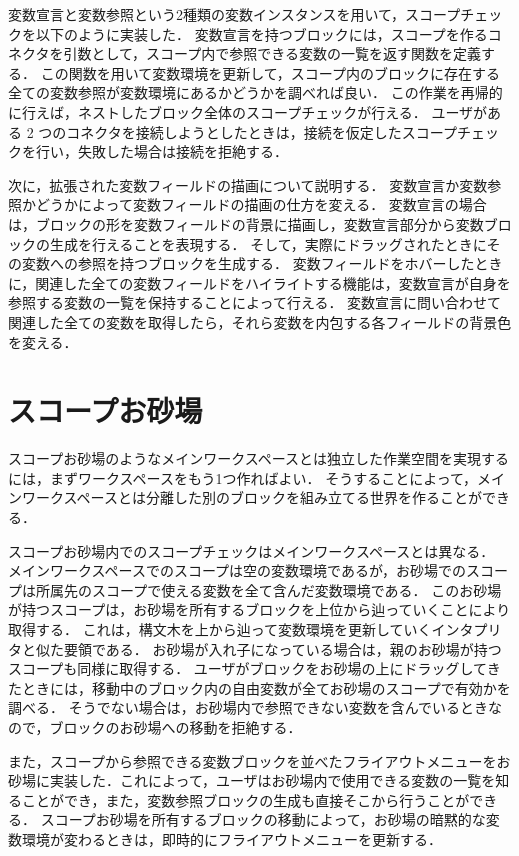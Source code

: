 変数宣言と変数参照という2種類の変数インスタンスを用いて，スコープチェックを以下のように実装した．
変数宣言を持つブロックには，スコープを作るコネクタを引数として，スコープ内で参照できる変数の一覧を返す関数を定義する．
この関数を用いて変数環境を更新して，スコープ内のブロックに存在する全ての変数参照が変数環境にあるかどうかを調べれば良い．
この作業を再帰的に行えば，ネストしたブロック全体のスコープチェックが行える．
ユーザがある 2 つのコネクタを接続しようとしたときは，接続を仮定したスコープチェックを行い，失敗した場合は接続を拒絶する．

次に，拡張された変数フィールドの描画について説明する．
変数宣言か変数参照かどうかによって変数フィールドの描画の仕方を変える．
変数宣言の場合は，ブロックの形を変数フィールドの背景に描画し，変数宣言部分から変数ブロックの生成を行えることを表現する．
そして，実際にドラッグされたときにその変数への参照を持つブロックを生成する．
変数フィールドをホバーしたときに，関連した全ての変数フィールドをハイライトする機能は，変数宣言が自身を参照する変数の一覧を保持することによって行える．
変数宣言に問い合わせて関連した全ての変数を取得したら，それら変数を内包する各フィールドの背景色を変える．

\section {スコープお砂場\label{impl:osunaba}}

スコープお砂場のようなメインワークスペースとは独立した作業空間を実現するには，まずワークスペースをもう1つ作ればよい．
そうすることによって，メインワークスペースとは分離した別のブロックを組み立てる世界を作ることができる．

スコープお砂場内でのスコープチェックはメインワークスペースとは異なる．
メインワークスペースでのスコープは空の変数環境であるが，お砂場でのスコープは所属先のスコープで使える変数を全て含んだ変数環境である．
このお砂場が持つスコープは，お砂場を所有するブロックを上位から辿っていくことにより取得する．
これは，構文木を上から辿って変数環境を更新していくインタプリタと似た要領である．
お砂場が入れ子になっている場合は，親のお砂場が持つスコープも同様に取得する．
ユーザがブロックをお砂場の上にドラッグしてきたときには，移動中のブロック内の自由変数が全てお砂場のスコープで有効かを調べる．
そうでない場合は，お砂場内で参照できない変数を含んでいるときなので，ブロックのお砂場への移動を拒絶する．

また，スコープから参照できる変数ブロックを並べたフライアウトメニューをお砂場に実装した．これによって，ユーザはお砂場内で使用できる変数の一覧を知ることができ，また，変数参照ブロックの生成も直接そこから行うことができる．
スコープお砂場を所有するブロックの移動によって，お砂場の暗黙的な変数環境が変わるときは，即時的にフライアウトメニューを更新する．

